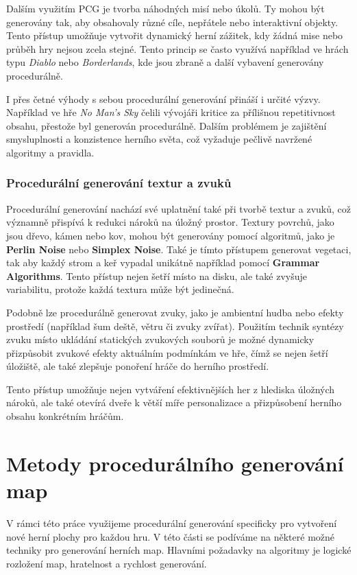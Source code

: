 Dalším využitím PCG je tvorba náhodných misí nebo úkolů. Ty mohou být generovány tak, aby obsahovaly různé cíle, nepřátele nebo interaktivní objekty. Tento přístup umožňuje vytvořit dynamický herní zážitek, kdy žádná mise nebo průběh hry nejsou zcela stejné. Tento princip se často využívá například ve hrách typu \emph{Diablo} nebo \emph{Borderlands}, kde jsou zbraně a další vybavení generovány procedurálně.

I přes četné výhody s sebou procedurální generování přináší i určité výzvy. Například ve hře \textit{No Man's Sky} čelili vývojáři kritice za přílišnou repetitivnost obsahu, přestože byl generován procedurálně. Dalším problémem je zajištění smysluplnosti a konzistence herního světa, což vyžaduje pečlivě navržené algoritmy a pravidla.

\subsubsection{Procedurální generování textur a zvuků}
Procedurální generování nachází své uplatnění také při tvorbě textur a zvuků, což významně přispívá k redukci nároků na úložný prostor. Textury povrchů, jako jsou dřevo, kámen nebo kov, mohou být generovány pomocí algoritmů, jako je \textbf{Perlin Noise} nebo \textbf{Simplex Noise}. Také je tímto přístupem generovat vegetaci, tak aby každý strom a keř vypadal unikátně například pomocí \textbf{Grammar Algorithms}. Tento přístup nejen šetří místo na disku, ale také zvyšuje variabilitu, protože každá textura může být jedinečná.

Podobně lze procedurálně generovat zvuky, jako je ambientní hudba nebo efekty prostředí (například šum deště, větru či zvuky zvířat). Použitím technik syntézy zvuku místo ukládání statických zvukových souborů je možné dynamicky přizpůsobit zvukové efekty aktuálním podmínkám ve hře, čímž se nejen šetří úložiště, ale také zlepšuje ponoření hráče do herního prostředí.

Tento přístup umožňuje nejen vytváření efektivnějších her z hlediska úložných nároků, ale také otevírá dveře k větší míře personalizace a přizpůsobení herního obsahu konkrétním hráčům.




\section{Metody procedurálního generování map}

V rámci této práce využijeme procedurální generování specificky pro vytvoření nové herní plochy pro každou hru. V této části se podíváme na některé možné techniky pro generování herních map. Hlavními požadavky na algoritmy je logické rozložení map, hratelnost a rychlost generování.

